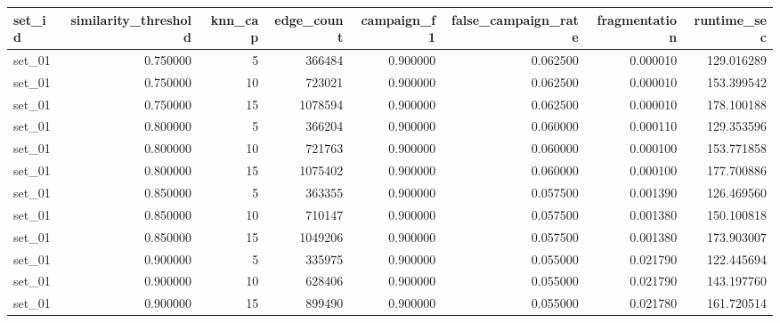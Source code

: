\begin{tabular}{lrrrrrrr}
\toprule
set_id & similarity_threshold & knn_cap & edge_count & campaign_f1 & false_campaign_rate & fragmentation & runtime_sec \\
\midrule
set_01 & 0.750000 & 5 & 366484 & 0.900000 & 0.062500 & 0.000010 & 129.016289 \\
set_01 & 0.750000 & 10 & 723021 & 0.900000 & 0.062500 & 0.000010 & 153.399542 \\
set_01 & 0.750000 & 15 & 1078594 & 0.900000 & 0.062500 & 0.000010 & 178.100188 \\
set_01 & 0.800000 & 5 & 366204 & 0.900000 & 0.060000 & 0.000110 & 129.353596 \\
set_01 & 0.800000 & 10 & 721763 & 0.900000 & 0.060000 & 0.000100 & 153.771858 \\
set_01 & 0.800000 & 15 & 1075402 & 0.900000 & 0.060000 & 0.000100 & 177.700886 \\
set_01 & 0.850000 & 5 & 363355 & 0.900000 & 0.057500 & 0.001390 & 126.469560 \\
set_01 & 0.850000 & 10 & 710147 & 0.900000 & 0.057500 & 0.001380 & 150.100818 \\
set_01 & 0.850000 & 15 & 1049206 & 0.900000 & 0.057500 & 0.001380 & 173.903007 \\
set_01 & 0.900000 & 5 & 335975 & 0.900000 & 0.055000 & 0.021790 & 122.445694 \\
set_01 & 0.900000 & 10 & 628406 & 0.900000 & 0.055000 & 0.021790 & 143.197760 \\
set_01 & 0.900000 & 15 & 899490 & 0.900000 & 0.055000 & 0.021780 & 161.720514 \\
\bottomrule
\end{tabular}
